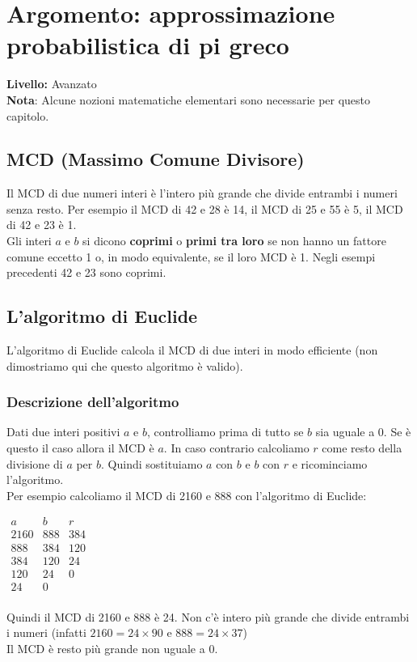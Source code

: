 \chapter{Argomento: approssimazione probabilistica di pi greco}

{ }\hfill\textbf{Livello:} Avanzato \\

\textbf{Nota}: Alcune nozioni matematiche elementari sono necessarie per questo capitolo.



\section{MCD (Massimo Comune Divisore)}

Il MCD di due numeri interi è l'intero più grande che divide entrambi i numeri senza resto. Per esempio il MCD di 42 e 28 è 14, il MCD di 25 e 55 è 5, il MCD di 42 e 23 è 1.\\

Gli interi $a$ e $b$ si dicono \textbf{coprimi} o \textbf{primi tra loro} se non hanno un fattore comune eccetto 1 o, in modo equivalente, se il loro MCD è 1. Negli esempi precedenti 42 e 23 sono coprimi.




\section{L'algoritmo di Euclide}
L'algoritmo di Euclide calcola il MCD di due interi in modo efficiente (non dimostriamo qui che questo algoritmo è valido).\\

\subsection{Descrizione dell'algoritmo}
Dati due interi positivi $a$ e $b$, controlliamo prima di tutto se $b$ sia uguale a 0. Se è questo il caso allora il MCD è $a$. In caso contrario calcoliamo $r$ come resto della divisione di $a$ per $b$. Quindi sostituiamo $a$ con $b$ e $b$ con $r$ e ricominciamo l'algoritmo.\\
Per esempio calcoliamo il MCD di 2160 e 888 con l'algoritmo di Euclide:
\begin{center}
	$
	\begin{array}{ccc}
		a & b & r\\
		2160 & 888 & 384 \\
		888 & 384 & 120 \\
		384 & 120 & 24 \\
		120 & 24 & 0 \\
		24 & 0 & \\
	\end{array}
	$
\end{center}
Quindi il MCD di 2160 e 888 è 24. Non c'è intero più grande che divide entrambi i numeri (infatti $2160=24\times90$ e $888=24\times37$)\\
Il MCD è resto più grande non uguale a 0.



